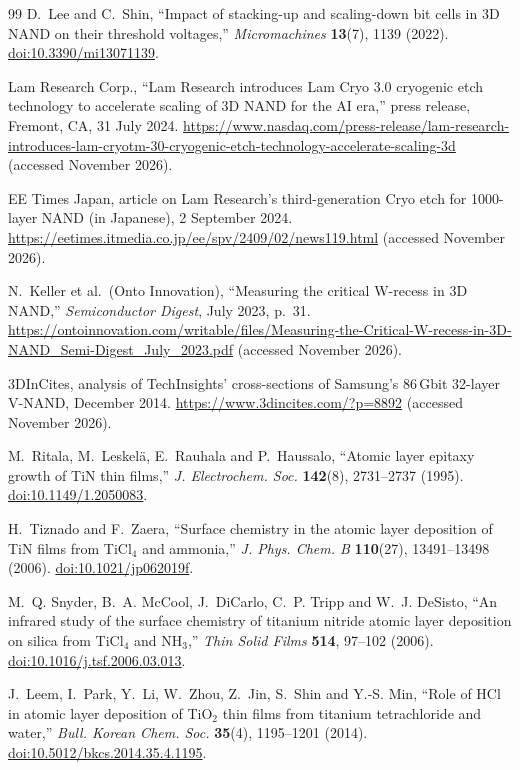 \documentclass[11pt,letterpaper]{article}
\begin{document}
\begin{thebibliography}{99}
D.~Lee and C.~Shin,
``Impact of stacking-up and scaling-down bit cells in 3D NAND on their threshold voltages,''
\emph{Micromachines} \textbf{13}(7), 1139 (2022).
\href{https://doi.org/10.3390/mi13071139}{doi:10.3390/mi13071139}.

Lam Research Corp., ``Lam Research introduces Lam Cryo 3.0 cryogenic etch technology to accelerate scaling of 3D NAND for the AI era,'' press release, Fremont, CA, 31 July 2024.
\url{https://www.nasdaq.com/press-release/lam-research-introduces-lam-cryotm-30-cryogenic-etch-technology-accelerate-scaling-3d} (accessed November 2026).

EE Times Japan, article on Lam Research's third-generation Cryo etch for 1000-layer NAND (in Japanese), 2 September 2024.
\url{https://eetimes.itmedia.co.jp/ee/spv/2409/02/news119.html} (accessed November 2026).

N.~Keller et al.\ (Onto Innovation), ``Measuring the critical W-recess in 3D NAND,'' \emph{Semiconductor Digest}, July 2023, p.~31.
\url{https://ontoinnovation.com/writable/files/Measuring-the-Critical-W-recess-in-3D-NAND_Semi-Digest_July_2023.pdf} (accessed November 2026).

3DInCites, analysis of TechInsights' cross-sections of Samsung's 86\,Gbit 32-layer V-NAND, December 2014.
\url{https://www.3dincites.com/?p=8892} (accessed November 2026).

M.~Ritala, M.~Leskel\"a, E.~Rauhala and P.~Haussalo,
``Atomic layer epitaxy growth of TiN thin films,''
\emph{J. Electrochem. Soc.} \textbf{142}(8), 2731--2737 (1995).
\href{https://doi.org/10.1149/1.2050083}{doi:10.1149/1.2050083}.

H.~Tiznado and F.~Zaera,
``Surface chemistry in the atomic layer deposition of TiN films from TiCl$_4$ and ammonia,''
\emph{J. Phys. Chem. B} \textbf{110}(27), 13491--13498 (2006).
\href{https://doi.org/10.1021/jp062019f}{doi:10.1021/jp062019f}.

M.~Q. Snyder, B.~A. McCool, J.~DiCarlo, C.~P. Tripp and W.~J. DeSisto,
``An infrared study of the surface chemistry of titanium nitride atomic layer deposition on silica from TiCl$_4$ and NH$_3$,''
\emph{Thin Solid Films} \textbf{514}, 97--102 (2006).
\href{https://doi.org/10.1016/j.tsf.2006.03.013}{doi:10.1016/j.tsf.2006.03.013}.

J.~Leem, I.~Park, Y.~Li, W.~Zhou, Z.~Jin, S.~Shin and Y.-S. Min,
``Role of HCl in atomic layer deposition of TiO$_2$ thin films from titanium tetrachloride and water,''
\emph{Bull. Korean Chem. Soc.} \textbf{35}(4), 1195--1201 (2014).
\href{https://doi.org/10.5012/bkcs.2014.35.4.1195}{doi:10.5012/bkcs.2014.35.4.1195}.


\end{thebibliography}
\end{document}
